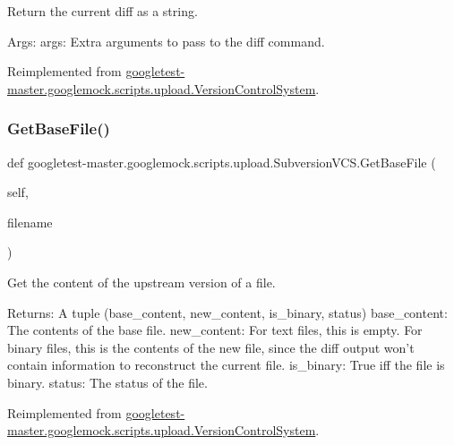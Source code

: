\begin{DoxyVerb}Return the current diff as a string.

Args:
  args: Extra arguments to pass to the diff command.
\end{DoxyVerb}
 

Reimplemented from \mbox{\hyperlink{classgoogletest-master_1_1googlemock_1_1scripts_1_1upload_1_1_version_control_system_ac248927b279c72356690eeacfb0e3841}{googletest-\/master.\+googlemock.\+scripts.\+upload.\+Version\+Control\+System}}.

\mbox{\label{classgoogletest-master_1_1googlemock_1_1scripts_1_1upload_1_1_subversion_v_c_s_a9e920210f36bc2a1f48d8e11aa4ba579}} 
\subsubsection{\texorpdfstring{GetBaseFile()}{GetBaseFile()}}
{\footnotesize\ttfamily def googletest-\/master.\+googlemock.\+scripts.\+upload.\+Subversion\+V\+C\+S.\+Get\+Base\+File (\begin{DoxyParamCaption}\item[{}]{self,  }\item[{}]{filename }\end{DoxyParamCaption})}

\begin{DoxyVerb}Get the content of the upstream version of a file.

Returns:
  A tuple (base_content, new_content, is_binary, status)
base_content: The contents of the base file.
new_content: For text files, this is empty.  For binary files, this is
  the contents of the new file, since the diff output won't contain
  information to reconstruct the current file.
is_binary: True iff the file is binary.
status: The status of the file.
\end{DoxyVerb}
 

Reimplemented from \mbox{\hyperlink{classgoogletest-master_1_1googlemock_1_1scripts_1_1upload_1_1_version_control_system_af5a7da9e4adf46f51e6a3c077e36688d}{googletest-\/master.\+googlemock.\+scripts.\+upload.\+Version\+Control\+System}}.

